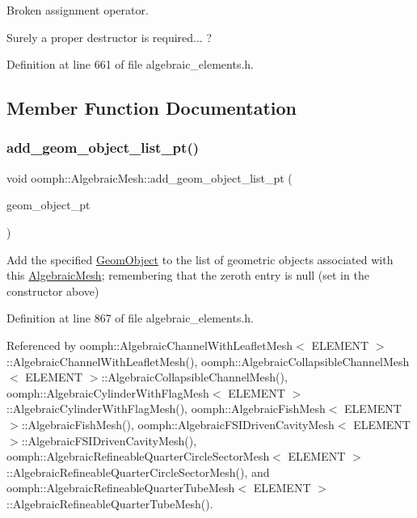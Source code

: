 Broken assignment operator. 

Surely a proper destructor is required... ? 

Definition at line 661 of file algebraic\+\_\+elements.\+h.



\subsection{Member Function Documentation}
\mbox{\label{classoomph_1_1AlgebraicMesh_ae3be691428fed5ec4b60cc5b7f7db49f}} 
\subsubsection{\texorpdfstring{add\+\_\+geom\+\_\+object\+\_\+list\+\_\+pt()}{add\_geom\_object\_list\_pt()}}
{\footnotesize\ttfamily void oomph\+::\+Algebraic\+Mesh\+::add\+\_\+geom\+\_\+object\+\_\+list\+\_\+pt (\begin{DoxyParamCaption}\item[{\hyperlink{classoomph_1_1GeomObject}{Geom\+Object} $\ast$}]{geom\+\_\+object\+\_\+pt }\end{DoxyParamCaption})\hspace{0.3cm}{\ttfamily [inline]}}



Add the specified \hyperlink{classoomph_1_1GeomObject}{Geom\+Object} to the list of geometric objects associated with this \hyperlink{classoomph_1_1AlgebraicMesh}{Algebraic\+Mesh}; remembering that the zeroth entry is null (set in the constructor above) 



Definition at line 867 of file algebraic\+\_\+elements.\+h.



Referenced by oomph\+::\+Algebraic\+Channel\+With\+Leaflet\+Mesh$<$ E\+L\+E\+M\+E\+N\+T $>$\+::\+Algebraic\+Channel\+With\+Leaflet\+Mesh(), oomph\+::\+Algebraic\+Collapsible\+Channel\+Mesh$<$ E\+L\+E\+M\+E\+N\+T $>$\+::\+Algebraic\+Collapsible\+Channel\+Mesh(), oomph\+::\+Algebraic\+Cylinder\+With\+Flag\+Mesh$<$ E\+L\+E\+M\+E\+N\+T $>$\+::\+Algebraic\+Cylinder\+With\+Flag\+Mesh(), oomph\+::\+Algebraic\+Fish\+Mesh$<$ E\+L\+E\+M\+E\+N\+T $>$\+::\+Algebraic\+Fish\+Mesh(), oomph\+::\+Algebraic\+F\+S\+I\+Driven\+Cavity\+Mesh$<$ E\+L\+E\+M\+E\+N\+T $>$\+::\+Algebraic\+F\+S\+I\+Driven\+Cavity\+Mesh(), oomph\+::\+Algebraic\+Refineable\+Quarter\+Circle\+Sector\+Mesh$<$ E\+L\+E\+M\+E\+N\+T $>$\+::\+Algebraic\+Refineable\+Quarter\+Circle\+Sector\+Mesh(), and oomph\+::\+Algebraic\+Refineable\+Quarter\+Tube\+Mesh$<$ E\+L\+E\+M\+E\+N\+T $>$\+::\+Algebraic\+Refineable\+Quarter\+Tube\+Mesh().

